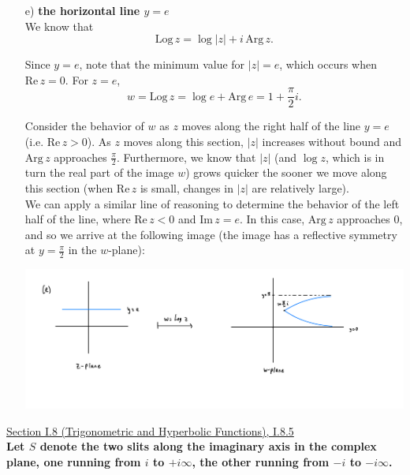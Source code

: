 \documentclass[11pt]{article}
\theoremstyle{definition}
\begin{document}
\begin{enumerate}[a)]
\item[e)] \textbf{the horizontal line $y=e$} \\

We know that \[\mathrm{Log} \, z = \log |z| + i \, \mathrm{Arg} \, z.\]

Since $y = e$, note that the minimum value for $|z| = e$, which occurs when $\mathrm{Re} \, z = 0.$ For $z = e$, \[w = \mathrm{Log} \, z = \log e + \mathrm{Arg} \, e = 1 + \frac{\pi}{2}i.\]

Consider the behavior of $w$ as $z$ moves along the right half of the line $y = e$ (i.e. $\mathrm{Re} \, z > 0$). As $z$ moves along this section, $|z|$ increases without bound and $\mathrm{Arg} \, z$ approaches $\frac{\pi}{2}$.
Furthermore, we know that $|z|$ (and $\log z$, which is in turn the real part of the image $w$) grows quicker the sooner we move along this section (when $\mathrm{Re} \, z$ is small, changes in $|z|$ are relatively large). \\

We can apply a similar line of reasoning to determine the behavior of the left half of the line, where $\mathrm{Re} \, z < 0$ and $\mathrm{Im} \, z = e$. In this case, $\mathrm{Arg} \, z$ approaches $0$, and so we arrive at the following image (the image has a reflective symmetry at $y = \frac{\pi}{2}$ in the $w$-plane): 

\begin{center}
  \includegraphics*[scale = 0.15]{I.6.2e.jpeg}
\end{center}

\end{enumerate}

\newpage

\underline{Section I.8 (Trigonometric and Hyperbolic Functions), I.8.5} \\

\textbf{Let $S$ denote the two slits along the imaginary axis in the complex plane, one running from $i$ to $+i\infty$, the other running from $-i$ to $-i\infty$.}
\end{document}
